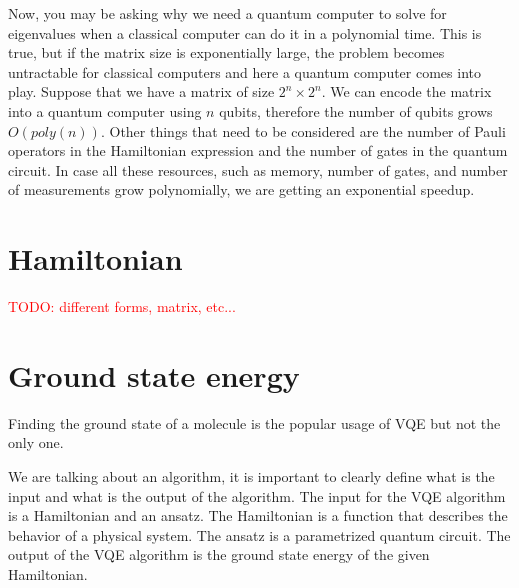 Now, you may be asking why we need a quantum computer to solve for eigenvalues when a classical computer can do it in a polynomial time. This is true, but if the matrix size is exponentially large, the problem becomes untractable for classical computers and here a quantum computer comes into play. Suppose that we have a matrix of size $2^n \times 2^n$. We can encode the matrix into a quantum computer using $n$ qubits, therefore the number of qubits grows $O(poly(n))$. Other things that need to be considered are the number of Pauli operators in the Hamiltonian expression and the number of gates in the quantum circuit. In case all these resources, such as memory, number of gates, and number of measurements grow polynomially, we are getting an exponential speedup.

\section{Hamiltonian}
\textcolor{red}{TODO: different forms, matrix, etc...}

\section{Ground state energy}
Finding the ground state of a molecule is the popular usage of VQE but not the only one.




We are talking about an algorithm, it is important to clearly define what is the input and what is the output of the algorithm. The input for the VQE algorithm is a Hamiltonian and an ansatz. The Hamiltonian is a function that describes the behavior of a physical system. The ansatz is a parametrized quantum circuit. The output of the VQE algorithm is the ground state energy of the given Hamiltonian.

